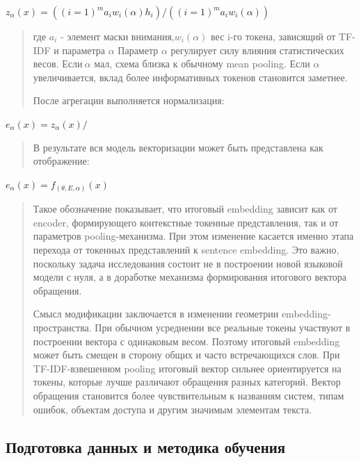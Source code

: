 \(z_{\alpha}(x) = \left( (i = 1)^{m}a_{i}w_{i}(\alpha)h_{i} \right)/\left( (i = 1)^{m}a_{i}w_{i}(\alpha) \right)\)

\begin{quote}
где \(a_{i}\) - элемент маски внимания,\(w_{i}(\alpha)\) вес i-го
токена, зависящий от TF-IDF и параметра \(\alpha\) Параметр \(\alpha\)
регулирует силу влияния статистических весов. Если\(\ \alpha\) мал,
схема близка к обычному mean pooling. Если \(\alpha\) увеличивается,
вклад более информативных токенов становится заметнее.

После агрегации выполняется нормализация:
\end{quote}

\(e_{\alpha}(x) = z_{\alpha}(x)/\)

\begin{quote}
В результате вся модель векторизации может быть представлена как
отображение:
\end{quote}

\(e_{\alpha}(x) = f_{(\theta,E,\alpha)}(x)\)

\begin{quote}
Такое обозначение показывает, что итоговый embedding зависит как от
encoder, формирующего контекстные токенные представления, так и от
параметров pooling-механизма. При этом изменение касается именно этапа
перехода от токенных представлений к sentence embedding. Это важно,
поскольку задача исследования состоит не в построении новой языковой
модели с нуля, а в доработке механизма формирования итогового вектора
обращения.

Смысл модификации заключается в изменении геометрии
embedding-пространства. При обычном усреднении все реальные токены
участвуют в построении вектора с одинаковым весом. Поэтому итоговый
embedding может быть смещен в сторону общих и часто встречающихся слов.
При TF-IDF-взвешенном pooling итоговый вектор сильнее ориентируется на
токены, которые лучше различают обращения разных категорий. Вектор
обращения становится более чувствительным к названиям систем, типам
ошибок, объектам доступа и другим значимым элементам текста.
\end{quote}

\hypertarget{ux43fux43eux434ux433ux43eux442ux43eux432ux43aux430-ux434ux430ux43dux43dux44bux445-ux438-ux43cux435ux442ux43eux434ux438ux43aux430-ux43eux431ux443ux447ux435ux43dux438ux44f}{%
\subsection{Подготовка данных и методика
обучения}\label{ux43fux43eux434ux433ux43eux442ux43eux432ux43aux430-ux434ux430ux43dux43dux44bux445-ux438-ux43cux435ux442ux43eux434ux438ux43aux430-ux43eux431ux443ux447ux435ux43dux438ux44f}}

